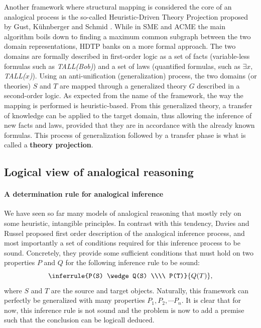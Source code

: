 Another framework where structural mapping is considered the core of an
analogical process is the so-called Heuristic-Driven Theory Projection proposed
by Gust, K\"uhnberger and Schmid \cite{GusKunSchTCS06}. While in SME and ACME
the main algorithm boils down to finding a maximum common subgraph between the
two domain representations, HDTP banks on a more formal approach. The two
domains are formally described in first-order logic as a set of facts
(variable-less formulas such as \textit{TALL(Bob)}) and a set of laws
(quantified formulas, such as \textit{$\exists x,$ TALL($x$)}). Using an
anti-unification (generalization) process, the two domains (or theories) $S$
and $T$ are mapped through a generalized theory $G$ described in a second-order
logic. As expected from the name of the framework, the way the mapping is
performed is heuristic-based. From this generalized theory, a transfer of
knowledge can be applied to the target domain, thus allowing the inference of
new facts and laws, provided that they are in accordance with the already known
formulas.  This process of generalization followed by a transfer phase is what
is called a \textbf{theory projection}.

\subsection{Logical view of analogical reasoning}

\paragraph{A determination rule for analogical inference\\}
\label{SEC:Davies_and_Russel}

We have seen so far many models of analogical reasoning that mostly rely on
some heuristic, intangible principles. In contrast with this tendency, Davies
and Russel \cite{DavRus87} proposed first order description of the analogical inference
process, and most importantly a set of conditions required for this inference
process to be sound.  Concretely, they provide some sufficient conditions that
must hold on two properties $P$ and $Q$ for the
following inference rule to be sound:
$$\inferrule{P(S) \wedge Q(S) \\\\ P(T)}{Q(T)},$$
where $S$ and $T$ are the source and target objects. Naturally, this framework
can perfectly be generalized with many properties $P_1, P_2, \cdots P_n$. It is
clear that for now, this inference rule is not sound and the problem is now to
add a premise such that the conclusion can be logicall deduced.


